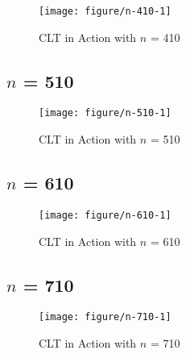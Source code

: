\documentclass[11pt,letter]{article}\usepackage[]{graphicx}\usepackage[]{color}
\makeatletter
\def\maxwidth{ %
  \ifdim\Gin@nat@width>\linewidth
    \linewidth
  \else
    \Gin@nat@width
  \fi
}
\newenvironment{knitrout}{}{} %
\makeatother
\begin{document}
\begin{knitrout}
\color{fgcolor}\begin{figure}[h]

{\centering \texttt{[image: figure/n-410-1]} 

}

\caption[CLT in Action with $n$ = 410]{CLT in Action with $n$ = 410}\label{fig:n-410}
\end{figure}


\end{knitrout}
\newpage
\subsection{$n$ = 510}

\begin{knitrout}
\color{fgcolor}\begin{figure}[h]

{\centering \texttt{[image: figure/n-510-1]} 

}

\caption[CLT in Action with $n$ = 510]{CLT in Action with $n$ = 510}\label{fig:n-510}
\end{figure}


\end{knitrout}
\newpage
\subsection{$n$ = 610}

\begin{knitrout}
\color{fgcolor}\begin{figure}[h]

{\centering \texttt{[image: figure/n-610-1]} 

}

\caption[CLT in Action with $n$ = 610]{CLT in Action with $n$ = 610}\label{fig:n-610}
\end{figure}


\end{knitrout}
\newpage
\subsection{$n$ = 710}

\begin{knitrout}
\color{fgcolor}\begin{figure}[h]

{\centering \texttt{[image: figure/n-710-1]} 

}

\caption[CLT in Action with $n$ = 710]{CLT in Action with $n$ = 710}\label{fig:n-710}
\end{figure}


\end{knitrout}
\newpage
\end{document}

